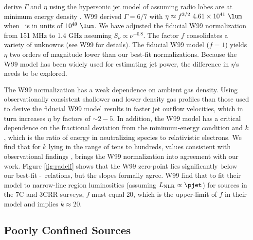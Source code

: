 \documentclass{emulateapj}
\begin{document}
\citet[][hereafter W99]{1999MNRAS.309.1017W} derive $\Gamma$ and
$\eta$ using the hypersonic jet model of \citet{1991MNRAS.250..581F}
assuming radio lobes are at minimum energy density \citep[see][for
  details]{1980ARA&A..18..165M}. W99 derived $\Gamma = 6/7$ with $\eta
\approx f^{3/2}~4.61\times10^{41} ~\lum$ when \prad\ is in units of
$10^{40} ~\lum$. We have adjusted the fiducial W99 normalization from
151 MHz to 1.4 GHz assuming $S_{\nu} \propto \nu^{-0.8}$. The factor
$f$ consolidates a variety of unknowns (see W99 for details). The
fiducial W99 model ($f=1$) yields $\eta$ two orders of magnitude lower
than our best-fit normalizations. Because the W99 model has been
widely used for estimating jet power, the difference in $\eta$'s needs
to be explored.

The W99 normalization has a weak dependence on ambient gas density.
Using observationally consistent shallower and lower density gas
profiles than those used to derive the fiducial W99 model results in
faster jet outflow velocities, which in turn increases $\eta$ by
factors of $\sim 2-5$. In addition, the W99 model has a critical
dependence on the fractional deviation from the minimum-energy
condition and $k$, which is the ratio of energy in neutralizing
species to relativistic electrons. We find that for $k$ lying in the
range of tens to hundreds, values consistent with observational
findings \citep{2005MNRAS.364.1343D, 2006MNRAS.372.1741D,
  2006ApJ...648..200D, birzan08}, brings the W99 normalization into
agreement with our work. Figure \ref{fig:radeff} shows that the W99
zero-point lies significantly below our best-fit
\pjet-\prad\ relations, but the slopes formally agree. W99 find that
to fit their model to narrow-line region luminosities (assuming
$L_{\mathrm{NLR}} \propto \pjet$) for sources in the 7C and 3CRR
surveys, $f$ must equal 20, which is the upper-limit of $f$ in their
model and implies $k \approx 20$.

\subsection{Poorly Confined Sources}
\label{sec:jet}
\end{document}
